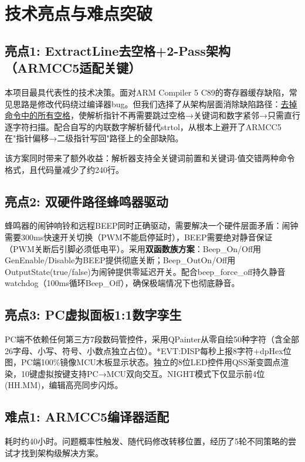 \documentclass[12pt,hyperref,a4paper,UTF8]{ctexart}
\begin{document}
\section{技术亮点与难点突破}

\subsection{亮点1: ExtractLine去空格+2-Pass架构 （ARMCC5适配关键）}

本项目最具代表性的技术决策。面对ARM Compiler 5 C89的寄存器缓存缺陷，常见思路是修改代码绕过编译器bug。但我们选择了从架构层面消除缺陷路径：\underline{去掉命令中的所有空格}，使解析指针不再需要跳过空格→关键词和数字紧邻→只需直行逐字符扫描。配合自写的内联数字解析替代strtol，从根本上避开了ARMCC5在"指针偏移→二级指针写回"路径上的全部缺陷。

该方案同时带来了额外收益：解析器支持全关键词前置和关键词-值交错两种命令格式，且代码量减少了约240行。

\subsection{亮点2: 双硬件路径蜂鸣器驱动}

蜂鸣器的闹钟响铃和远程BEEP同时正确驱动，需要解决一个硬件层面矛盾：闹钟需要300ms快速开关切换（PWM不能启停延时），BEEP需要绝对静音保证（PWM关断后引脚必须低电平）。采用\textbf{双函数族方案}：Beep\_On/Off用GenEnable/Disable为BEEP提供彻底关断；Beep\_OutOn/Off用OutputState(true/false)为闹钟提供零延迟开关。配合beep\_force\_off持久静音watchdog（100ms循环Beep\_Off），确保极端情况下也彻底静音。

\subsection{亮点3: PC虚拟面板1:1数字孪生}

PC端不依赖任何第三方7段数码管控件，采用QPainter从零自绘50种字符（含全部26字母、小写、符号、小数点独立占位）。*EVT:DISP每秒上报8字符+dpHex位图，PC端100\%镜像MCU木板显示状态。独立的8位LED控件用QSS渐变圆点渲染，10键虚拟按键支持PC→MCU双向交互。NIGHT模式下仅显示前4位(HH.MM)，编辑高亮同步闪烁。

\subsection{难点1: ARMCC5编译器适配} 耗时约40小时。问题概率性触发、随代码修改转移位置，经历了5轮不同策略的尝试才找到架构级解决方案。
\end{document}
